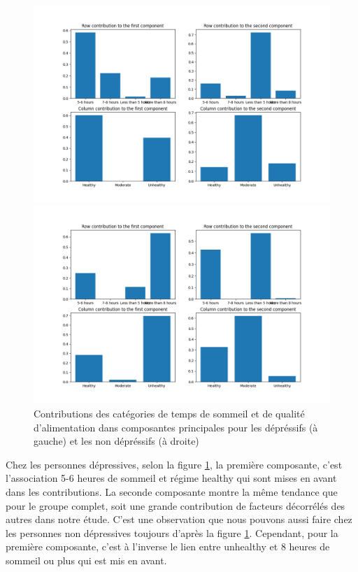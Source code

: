 \begin{figure}[H]
  \centering
  \begin{minipage}{0.5\textwidth}
    \centering
    \includegraphics[width=\linewidth]{Images/Sleep_Dietary_depressive/RowColumnsContributions.png}
  \end{minipage}\hfill
  \begin{minipage}{0.5\textwidth}
    \centering
    \includegraphics[width=\linewidth]{Images/Sleep_Dietary_non_depressive/RowColumnsContributions.png}
  \end{minipage}  
  \caption{Contributions des catégories de temps de sommeil et de qualité d'alimentation dans composantes principales pour les dépréssifs (à gauche) et les non dépréssifs (à droite)}
  \label{fig:contribSleepDietary}
\end{figure}

Chez les personnes dépressives, selon la figure \ref{fig:contribSleepDietary},  la première composante, c’est l’association 5-6 heures de sommeil et régime healthy qui sont mises en avant dans les contributions. La seconde composante montre la même tendance que pour le groupe complet, soit une grande contribution de facteurs décorrélés des autres dans notre étude. C’est une observation que nous pouvons aussi faire chez les personnes non dépressives toujours d’après la figure \ref{fig:contribSleepDietary}. Cependant, pour la première composante, c’est à l’inverse le lien entre unhealthy et 8 heures de sommeil ou plus qui est mis en avant.

